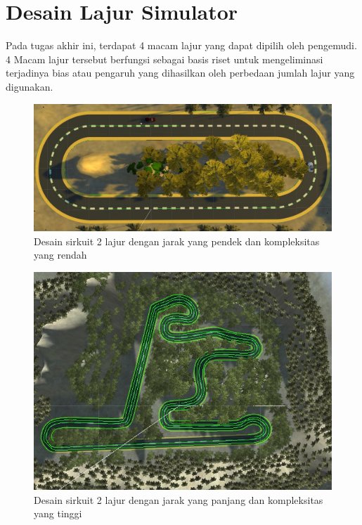 \section{Desain Lajur Simulator}
\vspace{1ex}

    \par Pada tugas akhir ini, terdapat 4 macam lajur yang dapat dipilih oleh pengemudi. 4 Macam lajur tersebut berfungsi sebagai basis riset untuk mengeliminasi terjadinya bias atau pengaruh yang dihasilkan oleh perbedaan jumlah lajur yang digunakan.
    
\begin{figure}  [!htb]
	\captionsetup{justification=centering}
	\includegraphics[scale=0.31]{img/2lj_short_oh.jpg}
	\caption{Desain sirkuit 2 lajur dengan jarak yang pendek dan kompleksitas yang rendah}
	\label{fig: 3_3}
\end{figure}
\vspace{1ex}

\begin{figure}  [!htb]
	\captionsetup{justification=centering}
	\includegraphics[scale=0.53]{img/2lj_long_oh.jpg}
	\caption{Desain sirkuit 2 lajur dengan jarak yang panjang dan kompleksitas yang tinggi}
	\label{fig: 3_4}
\end{figure}
\vspace{1ex}

